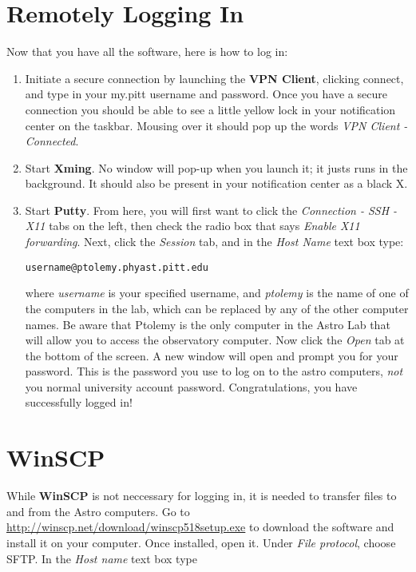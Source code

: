 \documentclass[11pt, preprint]{aastex}
\begin{document}
\section{Remotely Logging In}
Now that you have all the software, here is how to log in:
\begin{enumerate}
\item Initiate a secure connection by launching the \textbf{VPN Client}, clicking connect, and type in your my.pitt username and password. Once you have a secure connection you should be able to see a little yellow lock in your notification center on the taskbar. Mousing over it should pop up the words \emph{VPN Client - Connected}.
\item Start \textbf{Xming}. No window will pop-up when you launch it; it justs runs in the background. It should also be present in your notification center as a black X.
\item Start \textbf{Putty}. From here, you will first want to click the \emph{Connection - SSH - X11} tabs on the left, then check the radio box that says \emph{Enable X11 forwarding}. Next, click the \emph{Session} tab, and in the \emph{Host Name} text box type:

\begin{verbatim}
username@ptolemy.phyast.pitt.edu
\end{verbatim}

where \emph{username} is your specified username, and \emph{ptolemy} is the name of one of the computers in the lab, which can be replaced by any of the other computer names. Be aware that Ptolemy is the only computer in the Astro Lab that will allow you to access the observatory computer. Now click the \emph{Open} tab at the bottom of the screen. A new window will open and prompt you for your password. This is the password you use to log on to the astro computers, \emph{not} you normal university account password. Congratulations, you have successfully logged in!
\end{enumerate}

\section{WinSCP}
While \textbf{WinSCP} is not neccessary for logging in, it is needed to transfer files to and from the Astro computers. Go to \url{http://winscp.net/download/winscp518setup.exe} to download the software and install it on your computer. Once installed, open it. Under \emph{File protocol}, choose SFTP. In the \emph{Host name} text box type 
\end{document}
